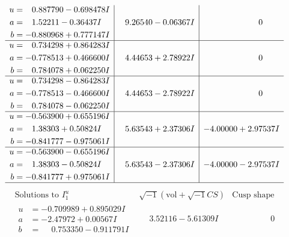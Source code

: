 \documentclass[1p]{elsarticle_modified}
\theoremstyle{definition}
\newcommand{\I}{\sqrt{-1}}
\begin{document}
$$\begin{array}{c|c|c}
\begin{aligned}
u &= \phantom{-}0.887790 - 0.698478 I \\
a &= \phantom{-}1.52211 - 0.36437 I \\
b &= -0.880968 + 0.777147 I\end{aligned}
 & \phantom{-}9.26540 - 0.06367 I & \phantom{-0.000000 } 0 \\ \hline\begin{aligned}
u &= \phantom{-}0.734298 + 0.864283 I \\
a &= -0.778513 + 0.466600 I \\
b &= \phantom{-}0.784078 + 0.062250 I\end{aligned}
 & \phantom{-}4.44653 + 2.78922 I & \phantom{-0.000000 } 0 \\ \hline\begin{aligned}
u &= \phantom{-}0.734298 - 0.864283 I \\
a &= -0.778513 - 0.466600 I \\
b &= \phantom{-}0.784078 - 0.062250 I\end{aligned}
 & \phantom{-}4.44653 - 2.78922 I & \phantom{-0.000000 } 0 \\ \hline\begin{aligned}
u &= -0.563900 + 0.655196 I \\
a &= \phantom{-}1.38303 + 0.50824 I \\
b &= -0.841777 - 0.975061 I\end{aligned}
 & \phantom{-}5.63543 + 2.37306 I & -4.00000 + 2.97537 I \\ \hline\begin{aligned}
u &= -0.563900 - 0.655196 I \\
a &= \phantom{-}1.38303 - 0.50824 I \\
b &= -0.841777 + 0.975061 I\end{aligned}
 & \phantom{-}5.63543 - 2.37306 I & -4.00000 - 2.97537 I\\
 \hline 
 \end{array}$$\newpage$$\begin{array}{c|c|c}  
\text{Solutions to }I^u_{1}& \I (\text{vol} + \sqrt{-1}CS) & \text{Cusp shape}\\
 \hline 
\begin{aligned}
u &= -0.709989 + 0.895029 I \\
a &= -2.47972 + 0.00567 I \\
b &= \phantom{-}0.753350 - 0.911791 I\end{aligned}
 & \phantom{-}3.52116 - 5.61309 I & \phantom{-0.000000 } 0 \\ \hline\begin{aligned}

\end{aligned}
\end{array}$$
\end{document}
